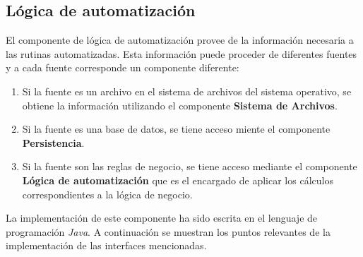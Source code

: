 \subsection{Lógica de automatización}
El componente de lógica de automatización provee de la información necesaria a las rutinas automatizadas. Esta información puede proceder de diferentes fuentes y a cada fuente corresponde un componente diferente:
\begin{enumerate}
 	\item Si la fuente es un archivo en el sistema de archivos del sistema operativo, se obtiene la información utilizando el componente \textbf{Sistema de Archivos}.
 	\item Si la fuente es una base de datos, se tiene acceso miente el componente \textbf{Persistencia}.
 	\item Si la fuente son las reglas de negocio, se tiene acceso mediante el componente \textbf{Lógica de automatización} que es el encargado de aplicar los cálculos correspondientes a la lógica de negocio.
\end{enumerate}
La implementación de este componente ha sido escrita en el lenguaje de programación \textit{Java}. A continuación se muestran los puntos relevantes de la implementación de las interfaces mencionadas.
